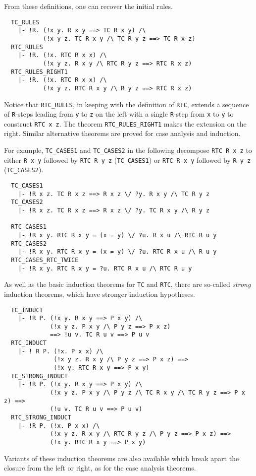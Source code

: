 From these definitions, one can recover the initial rules.
%
\begin{hol}
{\small
\begin{verbatim}
  TC_RULES
    |- !R. (!x y. R x y ==> TC R x y) /\
           (!x y z. TC R x y /\ TC R y z ==> TC R x z)
  RTC_RULES
    |- !R. (!x. RTC R x x) /\
           (!x y z. R x y /\ RTC R y z ==> RTC R x z)
  RTC_RULES_RIGHT1
    |- !R. (!x. RTC R x x) /\
           (!x y z. RTC R x y /\ R y z ==> RTC R x z)
\end{verbatim}}
\end{hol}
%
Notice that {\small\verb+RTC_RULES+}, in keeping with the definition
of {\small\verb+RTC+}, extends a sequence of \verb+R+-steps leading
from \verb+y+ to \verb+z+ on the left with a single \verb+R+-step from
\verb+x+ to \verb+y+ to construct \verb+RTC x z+. The theorem
{\small\verb+RTC_RULES_RIGHT1+} makes the extension on the right.
Similar alternative theorems are proved for case analysis and induction.

For example, {\small\verb+TC_CASES1+} and {\small\verb+TC_CASES2+} in the
following decompose {\small\verb+RTC R x z+} to either
{\small\verb+R x y+} followed by {\small\verb+RTC R y z+}
({\small\verb+TC_CASES1+})
or
{\small\verb+RTC R x y+} followed by {\small\verb+R y z+}
({\small\verb+TC_CASES2+}).

%
\begin{hol}
{\small
\begin{verbatim}
  TC_CASES1
    |- !R x z. TC R x z ==> R x z \/ ?y. R x y /\ TC R y z
  TC_CASES2
    |- !R x z. TC R x z ==> R x z \/ ?y. TC R x y /\ R y z

  RTC_CASES1
    |- !R x y. RTC R x y = (x = y) \/ ?u. R x u /\ RTC R u y
  RTC_CASES2
    |- !R x y. RTC R x y = (x = y) \/ ?u. RTC R x u /\ R u y
  RTC_CASES_RTC_TWICE
    |- !R x y. RTC R x y = ?u. RTC R x u /\ RTC R u y
\end{verbatim}}
\end{hol}

As well as the basic induction theorems for {\small\verb+TC+} and
{\small\verb+RTC+}, there are so-called \emph{strong} induction
theorems, which have stronger induction hypotheses.
%
\begin{hol}
{\small
\begin{verbatim}
  TC_INDUCT
    |- !R P. (!x y. R x y ==> P x y) /\
             (!x y z. P x y /\ P y z ==> P x z)
             ==> !u v. TC R u v ==> P u v
  RTC_INDUCT
    |- ! R P. (!x. P x x) /\
              (!x y z. R x y /\ P y z ==> P x z) ==>
              (!x y. RTC R x y ==> P x y)
  TC_STRONG_INDUCT
    |- !R P. (!x y. R x y ==> P x y) /\
             (!x y z. P x y /\ P y z /\ TC R x y /\ TC R y z ==> P x z) ==>
             (!u v. TC R u v ==> P u v)
  RTC_STRONG_INDUCT
    |- !R P. (!x. P x x) /\
             (!x y z. R x y /\ RTC R y z /\ P y z ==> P x z) ==>
             (!x y. RTC R x y ==> P x y)
\end{verbatim}}
\end{hol}
Variants of these induction theorems are also available which break
apart the closure from the left or right, as for the case analysis theorems.

